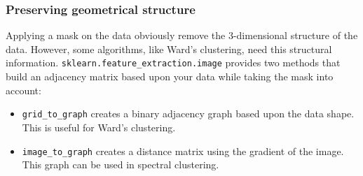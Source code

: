 \documentclass{frontiersSCNS} %
\newcommand{\alex}[1]{\todo[inline, color=green!40]{#1}}
\begin{document}


\subsubsection{Preserving geometrical structure}

Applying a mask on the data obviously remove the 3-dimensional structure of the
data. However, some algorithms, like Ward's clustering, need this structural
information.
\verb!sklearn.feature_extraction.image! provides two methods that build an
adjacency matrix based upon your data while taking the mask into account:
\begin{itemize}
    \item \verb!grid_to_graph! creates a binary adjacency graph based upon the
        data shape. This is useful for Ward's clustering.
    \item \verb!image_to_graph! creates a distance matrix using the gradient of
        the image. This graph can be used in spectral clustering.
\end{itemize}




\end{document}
